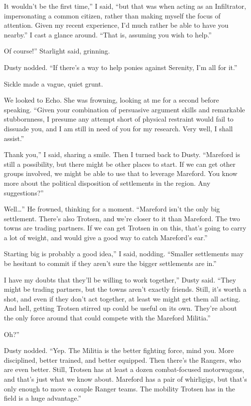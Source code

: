 \leavevmode{}It wouldn’t be the first time,” I said, “but that was when acting as an Infiltrator, impersonating a common citizen, rather than making myself the focus of attention. Given my recent experience, I’d much rather be able to have you nearby.” I cast a glance around. “That is, assuming you wish to help.”

\leavevmode{}Of course!” Starlight said, grinning.

Dusty nodded. “If there’s a way to help ponies against Serenity, I’m all for it.”

Sickle made a vague, quiet grunt.

We looked to Echo. She was frowning, looking at me for a second before speaking. “Given your combination of persuasive argument skills and remarkable stubbornness, I presume any attempt short of physical restraint would fail to dissuade you, and I am still in need of you for my research. Very well, I shall assist.”

\leavevmode{}Thank you,” I said, sharing a smile. Then I turned back to Dusty. “Mareford is still a possibility, but there might be other places to start. If we can get other groups involved, we might be able to use that to leverage Mareford. You know more about the political disposition of settlements in the region. Any suggestions?”

\leavevmode{}Well…” He frowned, thinking for a moment. “Mareford isn’t the only big settlement. There’s also Trotsen, and we’re closer to it than Mareford. The two towns are trading partners. If we can get Trotsen in on this, that’s going to carry a lot of weight, and would give a good way to catch Mareford’s ear.”

\leavevmode{}Starting big is probably a good idea,” I said, nodding. “Smaller settlements may be hesitant to commit if they aren’t sure the bigger settlements are in.”

\leavevmode{}I have my doubts that they’ll be willing to work together,” Dusty said. “They might be trading partners, but the towns aren’t exactly friends. Still, it’s worth a shot, and even if they don’t act together, at least we might get them all acting. And hell, getting Trotsen stirred up could be useful on its own. They’re about the only force around that could compete with the Mareford Militia.”

\leavevmode{}Oh?”

Dusty nodded. “Yep. The Militia is the better fighting force, mind you. More disciplined, better trained, and better equipped. Then there’s the Rangers, who are even better. Still, Trotsen has at least a dozen combat-focused motorwagons, and that’s just what we know about. Mareford has a pair of whirligigs, but that’s only enough to move a couple Ranger teams. The mobility Trotsen has in the field is a huge advantage.”

